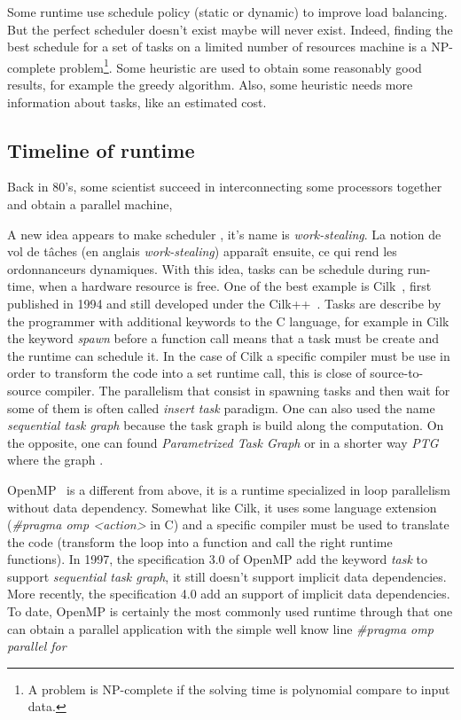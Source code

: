 Some runtime use schedule policy (static or dynamic) to improve load balancing.
%
But the perfect scheduler doesn't exist maybe will never exist.
%
Indeed, finding the best schedule for a set of tasks on a limited number of resources machine is a NP-complete problem\footnote{A problem is NP-complete if the solving time is polynomial compare to input data.}.
%
Some heuristic are used to obtain some reasonably good results, for example the greedy algorithm.
%
Also, some heuristic needs more information about tasks, like an estimated cost.


\subsection{Timeline of runtime}
Back in 80's, some scientist succeed in interconnecting some processors together and obtain a parallel machine,

A new idea appears to make scheduler , it's name is {\em work-stealing}.
La notion de vol de tâches (en anglais \textit{work-stealing}) apparaît ensuite, ce qui rend les ordonnanceurs dynamiques.
%
With this idea, tasks can be schedule during run-time, when a hardware resource is free.
%
One of the best example is Cilk~\cite{Cilk}, first published in 1994 and still developed under the Cilk++~\cite{Cilk++}.
%
Tasks are describe by the programmer with additional keywords to the C language, for example in Cilk the keyword {\em spawn} before a function call means that a task must be create and the runtime can schedule it.
%
In the case of Cilk a specific compiler must be use in order to transform the code into a set runtime call, this is close of source-to-source compiler.
%
The parallelism that consist in spawning tasks and then wait for some of them is often called {\em insert task} paradigm.
%
One can also used the name {\em sequential task graph} because the task graph is build along the computation.
%
On the opposite, one can found {\em Parametrized Task Graph} or in a shorter way {\em PTG} where the graph .

OpenMP~\cite{OpenMP} is a different from above, it is a runtime specialized in loop parallelism without data dependency.
%
Somewhat like Cilk, it uses some language extension ({\em \#pragma omp <action>} in C) and a specific compiler must be used to translate the code (transform the loop into a function and call the right runtime functions).
%
In 1997, the specification 3.0 of OpenMP add the keyword {\em task} to support {\em sequential task graph}, it still doesn't support implicit data dependencies.
%
More recently, the specification 4.0 add an support of implicit data dependencies.
%
To date, OpenMP is certainly the most commonly used runtime through that one can obtain a parallel application with the simple well know line {\em \#pragma omp parallel for}


